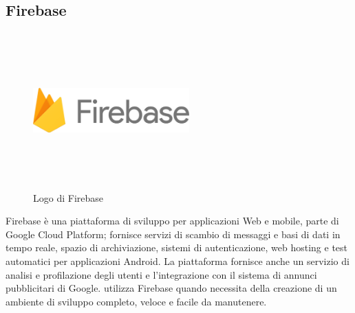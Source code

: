    \subsection{Firebase}
   \begin{figure}[H]
      \begin{center}
         \includegraphics[width=6cm,height=6cm,keepaspectratio]{immagini/firebase-logo}
      \end{center}
      \caption{Logo di Firebase}\label{logofirebase}
   \end{figure}
   Firebase è una piattaforma di sviluppo per applicazioni Web e mobile, parte di Google Cloud Platform; fornisce servizi di scambio di messaggi e basi di dati in tempo reale, spazio di archiviazione, sistemi di autenticazione, web hosting e test automatici per applicazioni Android. La piattaforma fornisce anche un servizio di analisi e profilazione degli utenti e l'integrazione con il sistema di annunci pubblicitari di Google.
   \nomeAzienda{} utilizza Firebase quando necessita della creazione di un ambiente di sviluppo completo, veloce e facile da manutenere.


